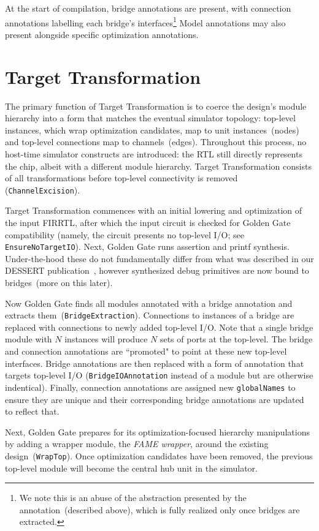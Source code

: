 At the start of compilation, bridge annotations are present, with connection
annotations labelling each bridge's interfaces\footnote{We note this is an abuse of the
abstraction presented by the annotation~(described above), which is fully realized only once bridges are extracted.}
Model annotations may also present alongside specific optimization annotations.

\section{Target Transformation}

The primary function of Target Transformation is to coerce the design's module
hierarchy into a form that matches the eventual simulator topology: top-level
instances, which wrap optimization candidates, map to unit instances~(nodes) and top-level connections map to
channels~(edges). Throughout this process, no host-time simulator constructs
are introduced: the RTL still directly represents the chip, albeit with a different module hierarchy.  Target Transformation
consists of all transformations before top-level connectivity is removed
(\texttt{ChannelExcision}).

Target Transformation commences with an initial lowering and optimization of the input FIRRTL, after which
the input circuit is checked for Golden Gate compatibility (namely, the circuit
presents no top-level I/O; see \texttt{EnsureNoTargetIO}). Next, Golden Gate
runs assertion and printf synthesis. Under-the-hood these do not fundamentally differ
from what was described in our DESSERT publication~\cite{DESSERT}, however
synthesized debug primitives are now bound to bridges~(more on this later).

Now Golden Gate finds all modules annotated with a bridge annotation and extracts
them~(\texttt{BridgeExtraction}). Connections to instances of
a bridge are replaced with connections to newly added
top-level I/O. Note that a single bridge module with $N$ instances will produce $N$
sets of ports at the top-level. The bridge and connection annotations are
``promoted" to point at these new top-level interfaces. Bridge annotations are then
replaced with a form of annotation that targets top-level I/O
(\texttt{BridgeIOAnnotation} instead of a module but are otherwise indentical).
Finally, connection annotations are assigned new \texttt{globalNames} to ensure they
are unique and their corresponding bridge annotations are updated to reflect
that.

Next, Golden Gate prepares for its optimization-focused hierarchy manipulations
by adding a wrapper module, the \emph{FAME wrapper}, around the existing
design~(\texttt{WrapTop}). Once optimization candidates have been removed, the
previous top-level module will become the central hub unit in the simulator.

